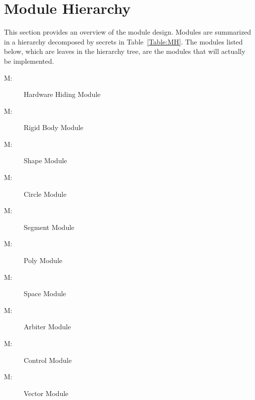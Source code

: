 \documentclass[12pt]{article}
\newcounter{modnum}
\newcommand{\mthemodnum}{M\themodnum}
\begin{document}
\section{Module Hierarchy}
\label{Sec:MH}
This section provides an overview of the module design. Modules are summarized in a hierarchy decomposed by secrets in Table~\ref{Table:MH}. The modules listed below, which are leaves in the hierarchy tree, are the modules that will actually be implemented.
\begin{description}
\item[\mthemodnum\label{MhwHiding}:]Hardware Hiding Module
\end{description}
\begin{description}
\item[\mthemodnum\label{Mmodbodyserv}:]Rigid Body Module
\end{description}
\begin{description}
\item[\mthemodnum\label{Mmodshapeserv}:]Shape Module
\end{description}
\begin{description}
\item[\mthemodnum\label{Mmodcircleserv}:]Circle Module
\end{description}
\begin{description}
\item[\mthemodnum\label{Mmodsegmentserv}:]Segment Module
\end{description}
\begin{description}
\item[\mthemodnum\label{Mmodpolyserv}:]Poly Module
\end{description}
\begin{description}
\item[\mthemodnum\label{Mmodspaceserv}:]Space Module
\end{description}
\begin{description}
\item[\mthemodnum\label{Mmodarbiterserv}:]Arbiter Module
\end{description}
\begin{description}
\item[\mthemodnum\label{MmodControl}:]Control Module
\end{description}
\begin{description}
\item[\mthemodnum\label{Mmodvectorserv}:]Vector Module
\end{description}
\end{document}
